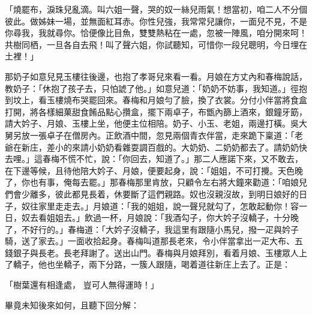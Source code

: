 「燒罷布，淚珠兒亂滴。叫六姐一聲，哭的奴一絲兒雨氣！想當初，咱二人不分個彼此。做姊妹一場，並無面紅耳赤。你性兒強，我常常兒讓你，一面兒不見，不是你尋我，我就尋你。恰便像比目魚，雙雙熱粘在一處，忽被一陣風，咱分開來呵！共樹同栖，一旦各自去飛！叫了聲六姐，你試聽知，可惜你一段兒聰明，今日埋在土裡！」

那奶子如意兒見玉樓往後邊，也抱了孝哥兒來看一看。月娘在方丈內和春梅說話，教奶子：「休抱了孩子去，只怕諕了他。」如意兒道：「奶奶不妨事，我知道。」徑抱到坟上，看玉樓燒布哭罷回來。春梅和月娘勻了臉，換了衣裳。分付小伴當將食盒打開，將各樣細菓甜食餚品點心攢盒，擺下兩卓子，布甑內篩上酒來，銀鐘牙筯，請大妗子、月娘、玉樓上坐，他便主位相陪。奶子、小玉、老姐，兩邊打橫。吳大舅另放一張卓子在僧房內。正飲酒中間，忽見兩個青衣伴當，走來跪下稟道：「老爺在新庄，差小的來請小奶奶看雜耍調百戲的。大奶奶、二奶奶都去了。請奶奶快去哩。」這春梅不慌不忙，說：「你回去，知道了。」那二人應諾下來，又不敢去，在下邊等候，且待他陪大妗子、月娘，便要起身，說：「姐姐，不可打攪。天色晚了，你也有事，俺每去罷。」那春梅那里肯放，只顧令左右將大鐘來勸道：「咱娘兒們會少離多，彼此都見長着，休要斷了這們親路。奴也沒親沒故，到明日娘好的日子，奴往家里走走去。」月娘道：「我的姐姐，說一聲兒就勾了，怎敢起動你！容一日，奴去看姐姐去。」飲過一杯，月娘說：「我酒勾子，你大妗子沒轎子，十分晚了，不好行的。」春梅道：「大妗子沒轎子，我這里有跟隨小馬兒，撥一疋與妗子騎，送了家去。」一面收拾起身。春梅叫道那長老來，令小伴當拿出一疋大布、五錢銀子與長老。長老拜謝了。送出山門。春梅與月娘拜別，看着月娘、玉樓眾人上了轎子，他也坐轎子，兩下分路，一簇人跟隨，喝着道往新庄上去了。正是：

「樹葉還有相逢處，  豈可人無得運時！」

畢竟未知後來如何，且聽下回分解：

